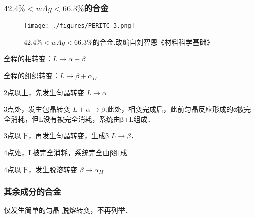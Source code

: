 





\subsubsection{$42.4\%<wAg<66.3\%$的合金}
\begin{figure}[ht]
\centering
\texttt{[image: ./figures/PERITC\_3.png]}
\caption{$42.4\%<wAg<66.3\%$的合金.改编自刘智恩《材料科学基础》} \label{PERITC_fig3}
\end{figure}
全程的相转变：$L \rightarrow \alpha+\beta$

全程的组织转变：$L \rightarrow \beta + \alpha_{II}$

2点以上，先发生匀晶转变 $L \rightarrow \alpha$

3点处，发生包晶转变 $L + \alpha \rightarrow \beta$.此处，相变完成后，此前匀晶反应形成的α被完全消耗，但L没有被完全消耗，系统由β+L组成．

3点以下，再发生匀晶转变，生成β $L \rightarrow \beta$．

4点处，L被完全消耗，系统完全由β组成

4点以下，发生脱溶转变 $\beta \rightarrow \alpha_{II}$

\subsubsection{其余成分的合金}
仅发生简单的匀晶-脱熔转变，不再列举．

